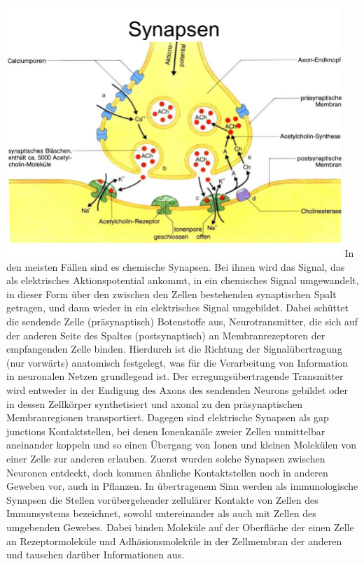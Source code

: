 \includegraphics[width=0.95\textwidth]{lectures/terms/pix/synapse.jpg}
In den meisten Fällen sind es chemische Synapsen. Bei ihnen wird das Signal, das als elektrisches Aktionspotential ankommt, in ein chemisches Signal umgewandelt, in dieser Form über den zwischen den Zellen bestehenden synaptischen Spalt getragen, und dann wieder in ein elektrisches Signal umgebildet. Dabei schüttet die sendende Zelle (präsynaptisch) Botenstoffe aus, Neurotransmitter, die sich auf der anderen Seite des Spaltes (postsynaptisch) an Membranrezeptoren der empfangenden Zelle binden. Hierdurch ist die Richtung der Signalübertragung (nur vorwärts) anatomisch festgelegt, was für die Verarbeitung von Information in neuronalen Netzen grundlegend ist. Der erregungsübertragende Transmitter wird entweder in der Endigung des Axons des sendenden Neurons gebildet oder in dessen Zellkörper synthetisiert und axonal zu den präsynaptischen Membranregionen transportiert.
Dagegen sind elektrische Synapsen als gap junctions Kontaktstellen, bei denen Ionenkanäle zweier Zellen unmittelbar aneinander koppeln und so einen Übergang von Ionen und kleinen Molekülen von einer Zelle zur anderen erlauben. Zuerst wurden solche Synapsen zwischen Neuronen entdeckt, doch kommen ähnliche Kontaktstellen noch in anderen Geweben vor, auch in Pflanzen.
In übertragenem Sinn werden als immunologische Synapsen die Stellen vorübergehender zellulärer Kontakte von Zellen des Immunsystems bezeichnet, sowohl untereinander als auch mit Zellen des umgebenden Gewebes. Dabei binden Moleküle auf der Oberfläche der einen Zelle an Rezeptormoleküle und Adhäsionsmoleküle in der Zellmembran der anderen und tauschen darüber Informationen aus.

